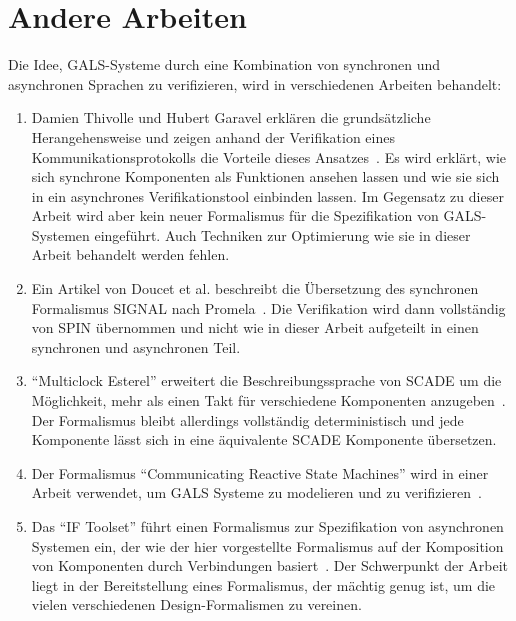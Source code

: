 \section{Andere Arbeiten}
\label{sec:related_works}
Die Idee, GALS-Systeme durch eine Kombination von synchronen und asynchronen Sprachen zu verifizieren, wird in verschiedenen Arbeiten behandelt:
\begin{enumerate}
\item Damien Thivolle und Hubert Garavel erklären die grundsätzliche Herangehensweise und zeigen anhand der Verifikation eines Kommunikationsprotokolls die Vorteile dieses Ansatzes~\cite{gals_sam}.
Es wird erklärt, wie sich synchrone Komponenten als Funktionen ansehen lassen und wie sie sich in ein asynchrones Verifikationstool einbinden lassen.
Im Gegensatz zu dieser Arbeit wird aber kein neuer Formalismus für die Spezifikation von GALS-Systemen eingeführt.
Auch Techniken zur Optimierung wie sie in dieser Arbeit behandelt werden fehlen.
\item Ein Artikel von Doucet et al. beschreibt die Übersetzung des synchronen Formalismus SIGNAL nach Promela~\cite{gals_signal}.
  Die Verifikation wird dann vollständig von SPIN übernommen und nicht wie in dieser Arbeit aufgeteilt in einen synchronen und asynchronen Teil.
\item "`Multiclock Esterel"' erweitert die Beschreibungssprache von SCADE um die Möglichkeit, mehr als einen Takt für verschiedene Komponenten anzugeben~\cite{multiclock_esterel}.
  Der Formalismus bleibt allerdings vollständig deterministisch und jede Komponente lässt sich in eine äquivalente SCADE Komponente übersetzen.
\item Der Formalismus "`Communicating Reactive State Machines"' wird in einer Arbeit verwendet, um GALS Systeme zu modelieren und zu verifizieren~\cite{gals_crsm}.
\item Das "`IF Toolset"' führt einen Formalismus zur Spezifikation von asynchronen Systemen ein, der wie der hier vorgestellte Formalismus auf der Komposition von Komponenten durch Verbindungen basiert~\cite{if_toolset}.
  Der Schwerpunkt der Arbeit liegt in der Bereitstellung eines Formalismus, der mächtig genug ist, um die vielen verschiedenen Design-Formalismen zu vereinen.
\end{enumerate}
